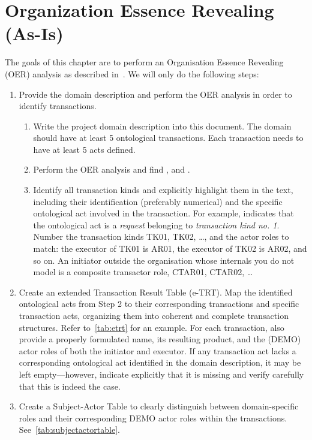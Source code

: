 \chapter{Organization Essence Revealing (As-Is)}


The goals of this chapter are to perform an Organisation Essence Revealing (OER) analysis as described in~\cite{dietz2015teoo,dietz2020enterprise}. We will only do the following steps: 

\begin{enumerate}
	\item Provide the domain description and perform the OER analysis in order to identify transactions.
	\begin{enumerate}
		\item Write the project domain description into this document. The domain should have at least 5 ontological transactions. Each transaction needs to have at least 5 acts defined.
		\item Perform the OER analysis and find ,  and . 
		\item Identify all transaction kinds and explicitly highlight them in the text, including their identification (preferably numerical) and the specific ontological act involved in the transaction. For example, \oact{[TK01/rq]} indicates that the ontological act is a \textit{request} belonging to \textit{transaction kind no. 1}. Number the transaction kinds TK01, TK02, \ldots, and the actor roles to match: the executor of TK01 is AR01, the executor of TK02 is AR02, and so on. An initiator outside the organisation whose internals you do not model is a composite transactor role, CTAR01, CTAR02, \ldots
	\end{enumerate}
    \item Create an extended Transaction Result Table (e-TRT). Map the identified ontological acts from Step 2 to their corresponding transactions and specific transaction acts, organizing them into coherent and complete transaction structures. Refer to~\cref{tab:etrt} for an example. For each transaction, also provide a properly formulated name, its resulting product, and the (DEMO) actor roles of both the initiator and executor. If any transaction act lacks a corresponding ontological act identified in the domain description, it may be left empty—however, indicate explicitly that it is missing and verify carefully that this is indeed the case.
    \item Create a Subject-Actor Table to clearly distinguish between domain-specific roles and their corresponding DEMO actor roles within the transactions. See~\cref{tab:subjectactortable}.

\end{enumerate}
